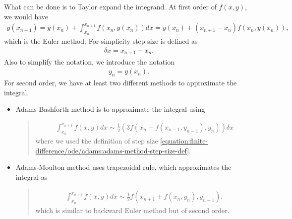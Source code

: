 \documentclass[letterpaper,12pt,english]{sphinxmanual}
\begin{document}
What can be done is to Taylor expand the integrand. At first order of \(f(x,y)\), we would have
\begin{equation*}
\begin{split}y(x_{n+1}) = y(x_n) + \int_{x_n}^{x_{n+1}} f(x_{n},y(x_n)) dx =  y(x_n) +(x_{n+1}- x_n) f(x_{n},y(x_n)) ,\end{split}
\end{equation*}
which is the Euler method. For simplicity step size is defined as
\label{\detokenize{finite-difference/ode/adams:equation-adams-method-step-size-def}}\begin{equation}\label{equation:finite-difference/ode/adams:adams-method-step-size-def}
\begin{split}\delta x = x_{n+1}- x_n.\end{split}
\end{equation}
Also to simplify the notation, we introduce the notation
\begin{equation*}
\begin{split}y_n = y(x_n).\end{split}
\end{equation*}
For second order, we have at least two different methods to approximate the integral.

\begin{itemize}
\item {} 
Adams-Bashforth method is to approximate the integral using
\begin{quote}
\begin{equation*}
\begin{split}\int_{x_n}^{x_{n+1}} f(x,y) dx \sim \frac{1}{2} ( 3 f( x_n - f( x_{n-1}, y_{n-1} ) , y_n) ) \delta x\end{split}
\end{equation*}
where we used the definition of step size \eqref{equation:finite-difference/ode/adams:adams-method-step-size-def}.
\end{quote}

\end{itemize}

\begin{itemize}
\item {} 
Adams-Moulton method uses trapezoidal rule, which approximates the integral as
\begin{quote}
\begin{equation*}
\begin{split}\int_{x_n}^{x_{n+1}} f(x,y) dx \sim \frac{1}{2} f( x_{n+1} + f(x_n, y_n) , y_{n+1} ),\end{split}
\end{equation*}
which is similar to backward Euler method but of second order.
\end{quote}

\end{itemize}
\end{document}
